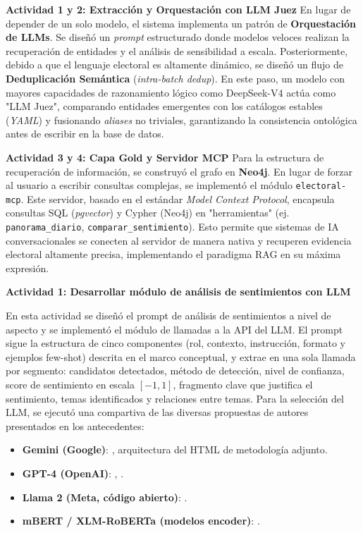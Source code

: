 \textbf{Actividad 1 y 2: Extracción y Orquestación con LLM Juez}
En lugar de depender de un solo modelo, el sistema implementa un patrón de \textbf{Orquestación de LLMs}. Se diseñó un \textit{prompt} estructurado donde modelos veloces realizan la recuperación de entidades y el análisis de sensibilidad a escala. Posteriormente, debido a que el lenguaje electoral es altamente dinámico, se diseñó un flujo de \textbf{Deduplicación Semántica} (\textit{intra-batch dedup}). En este paso, un modelo con mayores capacidades de razonamiento lógico como DeepSeek-V4 actúa como "LLM Juez", comparando entidades emergentes con los catálogos estables (\textit{YAML}) y fusionando \textit{aliases} no triviales, garantizando la consistencia ontológica antes de escribir en la base de datos.

\textbf{Actividad 3 y 4: Capa Gold y Servidor MCP}
Para la estructura de recuperación de información, se construyó el grafo en \textbf{Neo4j}. En lugar de forzar al usuario a escribir consultas complejas, se implementó el módulo \texttt{electoral-mcp}. Este servidor, basado en el estándar \textit{Model Context Protocol}, encapsula consultas SQL (\textit{pgvector}) y Cypher (Neo4j) en "herramientas" (ej. \texttt{panorama\_diario}, \texttt{comparar\_sentimiento}). Esto permite que sistemas de IA conversacionales se conecten al servidor de manera nativa y recuperen evidencia electoral altamente precisa, implementando el paradigma RAG en su máxima expresión.


\textbf{Actividad 1: Desarrollar módulo de análisis de sentimientos con LLM}
 
En esta actividad se diseñó el prompt de análisis de sentimientos a nivel de aspecto y se
implementó el módulo de llamadas a la API del LLM. El prompt sigue la estructura de
cinco componentes (rol, contexto, instrucción, formato y ejemplos few-shot) descrita en el
marco conceptual, y extrae en una sola llamada por segmento: candidatos detectados,
método de detección, nivel de confianza, score de sentimiento en escala $[-1, 1]$,
fragmento clave que justifica el sentimiento, temas identificados y relaciones entre temas.
Para la selección del LLM, se ejecutó una compartiva de las diversas propuestas de 
autores presentados en los antecedentes:
 
\begin{itemize}
    \item \textbf{Gemini (Google)}: \cite{pr_alvarez2023llm_political}, arquitectura del HTML de metodología adjunto.
    \item \textbf{GPT-4 (OpenAI)}: \cite{pr_gujral2024llm_elections}, \cite{pr_chen2024combating_misinformation}.
    \item \textbf{Llama 2 (Meta, código abierto)}: \cite{pr_gujral2024llm_elections}.
    \item \textbf{mBERT / XLM-RoBERTa (modelos encoder)}: \cite{pr_alvi2023twitter_election_review}.
\end{itemize}
 

